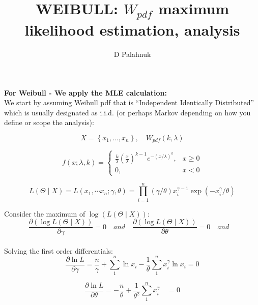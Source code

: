 \documentclass[11pt, oneside]{article}	%
\title{WEIBULL: $W_{pdf}$ maximum likelihood estimation, analysis}
\author{D Palahnuk}
\begin{document}
	\maketitle
	




	
\textbf{For Weibull - We apply the MLE calculation:} \\


We start by assuming Weibull pdf that is ``Independent Identically Distributed'' which is usually designated as i.i.d. (or perhaps Markov depending on how you define or scope the analysis): 

$$
X = \left\{x_{1}, \ldots, x_{n}\right\}, \quad W{_{pdf}}(k, \lambda)
$$






$$
f(x ; \lambda, k)= \begin{cases}\frac{k}{\lambda}\left(\frac{x}{\lambda}\right)^{k-1} e^{-(x / \lambda)^{k}}, & x \geq 0 \\ 0, & x<0\end{cases}
$$




$$
L\left(\Theta \mid X \right)= L\left(x_{1}, \cdots x_{n} ; \gamma, \theta\right)=\prod_{i=1}^{n}(\gamma / \theta) x_{i}^{\gamma-1} \exp \left(-x_{i}^{\gamma} / \theta\right)
$$

Consider the maximum of $\log \left(L\left(\Theta \mid X \right)\right)$:\\

$$
\frac{\partial (\log L\left(\Theta \mid X \right))}{\partial \gamma}=0 
\quad and \quad
\frac{\partial (\log L\left(\Theta \mid X \right))}{\partial \theta}=0 
\quad and \quad 
$$\\

Solving the first order differentials:\\

$$
\frac{\partial \ln L}{\partial \gamma}=\frac{n}{\gamma}+\sum_{1}^{n} \ln x_{i}-\frac{1}{\theta} \sum_{1}^{n} x_{i}^{\gamma} \ln x_{i}=0
$$

$$
\frac{\partial \ln L}{\partial \theta}=-\frac{n}{\theta}+\frac{1}{\theta^{2}} \sum_{1}^{n} x_{i}^{\gamma} \quad=0
$$
\end{document}

